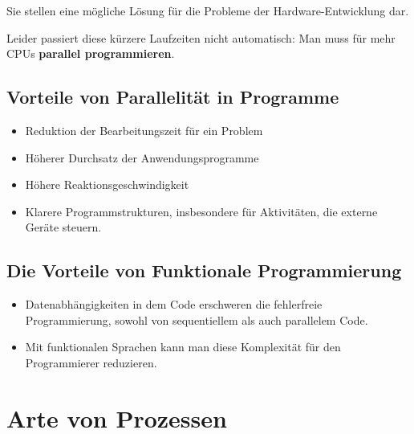 \documentclass[11pt]{article}
\begin{document}
Sie stellen eine mögliche Lösung für die Probleme der Hardware-Entwicklung dar.

Leider passiert diese kürzere Laufzeiten nicht automatisch: Man muss für mehr CPUs \textbf{parallel programmieren}.

\subsection{Vorteile von Parallelität in Programme}
\begin{itemize}
    \item Reduktion der Bearbeitungszeit für ein Problem
    \item Höherer Durchsatz der Anwendungsprogramme
    \item Höhere Reaktionsgeschwindigkeit
    \item Klarere Programmstrukturen, insbesondere für Aktivitäten, die externe Geräte steuern.
\end{itemize}

\subsection{Die Vorteile von Funktionale Programmierung}
\begin{itemize}
    \item Datenabhängigkeiten in dem Code erschweren die fehlerfreie Programmierung, sowohl von sequentiellem als auch parallelem Code.
    \item Mit funktionalen Sprachen kann man diese Komplexität für den Programmierer reduzieren.
\end{itemize}

\section{Arte von Prozessen}
\end{document}
